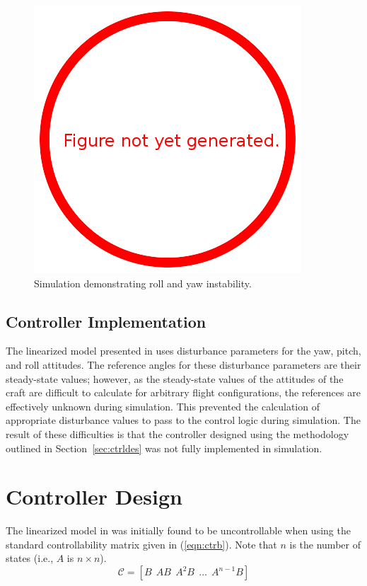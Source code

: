 \documentclass{sydeStyle}
\begin{document}
\begin{figure}
    \begin{center}
        \includegraphics{figs/todo}
    \end{center}
    \caption{Simulation demonstrating roll and yaw instability.}
    \label{fig:rollinstability}
\end{figure}

\subsection{Controller Implementation}
\label{sec:ctrlimpl}
The linearized model presented in \cite{spottiswoode} uses disturbance
parameters for the yaw, pitch, and roll attitudes.  The reference angles for
these disturbance parameters are their steady-state values; however, as the
steady-state values of the attitudes of the craft are difficult to calculate for
arbitrary flight configurations, the references are effectively unknown during
simulation.  This prevented the calculation of appropriate disturbance values to
pass to the control logic during simulation.  The result of these difficulties
is that the controller designed using the methodology outlined in
Section~\ref{sec:ctrldes} was not fully implemented in simulation.

\section{Controller Design}
The linearized model in \cite{spottiswoode} was initially found to be
uncontrollable when using the standard controllability matrix given in
(\ref{eqn:ctrb}).  Note that $n$ is the number of states (i.e., $A$ is $n \times
n$).
\begin{equation}
    \mathcal{C} = [B \;\, AB \;\, A^2B \;\, \ldots \;\, A^{n-1}B]
    \label{eqn:ctrb}
\end{equation}
\end{document}
